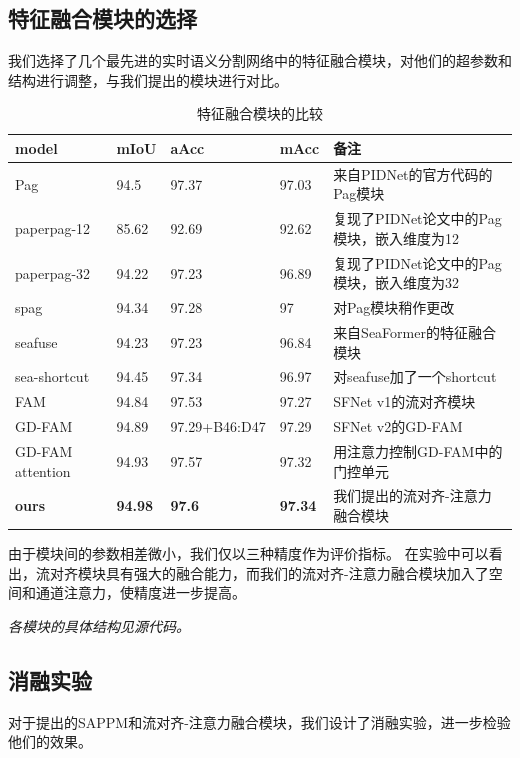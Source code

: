 \documentclass[11pt]{article}
\begin{document}
\subsection{特征融合模块的选择}
我们选择了几个最先进的实时语义分割网络中的特征融合模块，对他们的超参数和结构进行调整，与我们提出的模块进行对比。
\begin{table}[H]
    \centering
    \begin{tabular}{|l|l|l|l|l|}
    \hline
        model & mIoU & aAcc & mAcc & 备注 \\ \hline
        Pag & 94.5 & 97.37 & 97.03 & 来自PIDNet的官方代码的Pag模块 \\ \hline
        paperpag-12 & 85.62 & 92.69 & 92.62 & 复现了PIDNet论文中的Pag模块，嵌入维度为12 \\ \hline
        paperpag-32 & 94.22 & 97.23 & 96.89 & 复现了PIDNet论文中的Pag模块，嵌入维度为32 \\ \hline
        spag & 94.34 & 97.28 & 97 & 对Pag模块稍作更改 \\ \hline
        seafuse & 94.23 & 97.23 & 96.84 & 来自SeaFormer的特征融合模块 \\ \hline
        sea-shortcut & 94.45 & 97.34 & 96.97 & 对seafuse加了一个shortcut \\ \hline
        FAM & 94.84 & 97.53 & 97.27 & SFNet v1的流对齐模块 \\ \hline
        GD-FAM & 94.89 & 97.29+B46:D47 & 97.29 & SFNet v2的GD-FAM \\ \hline
        GD-FAM attention & 94.93 & 97.57 & 97.32 & 用注意力控制GD-FAM中的门控单元 \\ \hline
        \textbf{ours} & \textbf{94.98} & \textbf{97.6} & \textbf{97.34} & 我们提出的流对齐-注意力融合模块 \\ \hline
    \end{tabular}
\caption{特征融合模块的比较}
  \label{table:5}
\end{table}

由于模块间的参数相差微小，我们仅以三种精度作为评价指标。
在实验中可以看出，流对齐模块具有强大的融合能力，而我们的流对齐-注意力融合模块加入了空间和通道注意力，使精度进一步提高。

\textit{各模块的具体结构见源代码。}
\subsection{消融实验}
对于提出的SAPPM和流对齐-注意力融合模块，我们设计了消融实验，进一步检验他们的效果。
\end{document}
